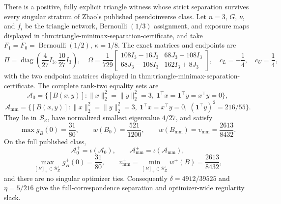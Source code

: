 There is a positive, fully explicit triangle witness whose strict separation survives every singular stratum of Zhao's published pseudoinverse class.  Let \(n=3\), \(G\), \(\nu\), and \(f_i\) be the triangle network, Bernoulli \((1/3)\) assignment, and exposure maps displayed in thm:triangle-minimax-separation-certificate, and take \(F_1=F_0=\operatorname{Bernoulli}(1/2)\), \(\kappa=1/8\).  The exact matrices and endpoints are
\[
\Pi=\operatorname{diag}\!\left(\frac4{27}I_3,\frac{10}{27}I_3\right),
\quad
\Omega=\frac1{729}
\begin{bmatrix}108I_3-16J_3&68J_3-108I_3\\68J_3-108I_3&162I_3+8J_3\end{bmatrix},
\quad c_L=-\frac14,\quad c_U=\frac14,
\]
with the two endpoint matrices displayed in thm:triangle-minimax-separation-certificate.  The complete rank-two equality sets are
\[
\mathcal A_0=\{[B(x,y)]:\lVert x\rVert_2^2=\lVert y\rVert_2^2=3,
\ \mathbf1^\top x=\mathbf1^\top y=x^\top y=0\},
\]
\[
\mathcal A_{\mathrm{mm}}=\{[B(x,y)]:\lVert x\rVert_2^2=\lVert y\rVert_2^2=3,
\ \mathbf1^\top x=x^\top y=0,\ (\mathbf1^\top y)^2=216/55\}.
\]
They lie in \(\mathcal B_\kappa\), have normalized smallest eigenvalue \(4/27\), and satisfy
\[
\max g_B(0)=\frac{31}{80},
\qquad w(B_0)=\frac{521}{1200},
\qquad w(B_{\mathrm{mm}})=v_{\mathrm{mm}}=\frac{2613}{8432}.
\]
On the full published class,
\[
\mathcal A_0^+=\iota(\mathcal A_0),
\qquad \mathcal A_{\mathrm{mm}}^+=\iota(\mathcal A_{\mathrm{mm}}),
\]
\[
\max_{[B]_+\in\mathcal B_Z^+}g_B^+(0)=\frac{31}{80},
\qquad v_{\mathrm{mm}}^+=\min_{[B]_+\in\mathcal B_Z^+}w^+(B)=\frac{2613}{8432},
\]
and there are no singular optimizer ties.  Consequently \(\delta=4912/39525\) and \(\eta=5/216\) give the full-correspondence separation and optimizer-wide regularity slack.